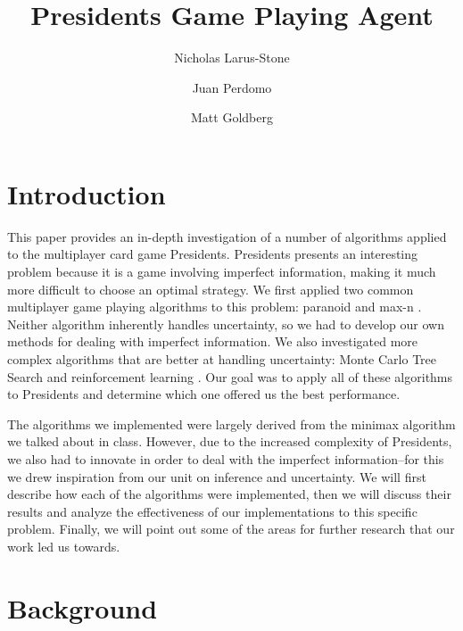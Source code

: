\documentclass[11pt]{article}
\title{Presidents Game Playing Agent}
\author{Nicholas Larus-Stone \and Juan Perdomo \and Matt Goldberg}
\begin{document}
\maketitle{}


\section{Introduction}

This paper provides an in-depth investigation of a number of algorithms applied to the multiplayer card game Presidents. Presidents presents an interesting problem because it is a game involving imperfect information, making it much more difficult to choose an optimal strategy. We first applied two common multiplayer game playing algorithms to this problem: paranoid and max-n \cite{sturtevant}. Neither algorithm inherently handles uncertainty, so we had to develop our own methods for dealing with imperfect information. We also investigated more complex algorithms that are better at handling uncertainty: Monte Carlo Tree Search \cite {browneMCTS} and reinforcement learning \cite{fujita}. Our goal was to apply all of these algorithms to Presidents and determine which one offered us the best performance.

The algorithms we implemented were largely derived from the minimax algorithm we talked about in class. However, due to the increased complexity of Presidents, we also had to innovate in order to deal with the imperfect information--for this we drew inspiration from our unit on inference and uncertainty. We will first describe how each of the algorithms were implemented, then we will discuss their results and analyze the effectiveness of our implementations to this specific problem. Finally, we will point out some of the areas for further research that our work led us towards.

\section{Background}
\end{document}
